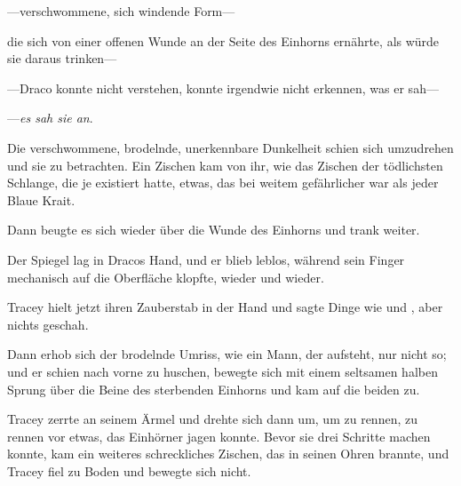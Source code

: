 —verschwommene, sich windende Form—

die sich von einer offenen Wunde an der Seite des Einhorns ernährte, als würde sie daraus trinken—

—Draco konnte nicht verstehen, konnte irgendwie nicht erkennen, was er sah—

—\emph{es sah sie an}.

Die verschwommene, brodelnde, unerkennbare Dunkelheit schien sich umzudrehen und sie zu betrachten. Ein Zischen kam von ihr, wie das Zischen der tödlichsten Schlange, die je existiert hatte, etwas, das bei weitem gefährlicher war als jeder Blaue Krait.

Dann beugte es sich wieder über die Wunde des Einhorns und trank weiter.

Der Spiegel lag in Dracos Hand, und er blieb leblos, während sein Finger mechanisch auf die Oberfläche klopfte, wieder und wieder.

Tracey hielt jetzt ihren Zauberstab in der Hand und sagte Dinge wie  und , aber nichts geschah.

Dann erhob sich der brodelnde Umriss, wie ein Mann, der aufsteht, nur nicht so; und er schien nach vorne zu huschen, bewegte sich mit einem seltsamen halben Sprung über die Beine des sterbenden Einhorns und kam auf die beiden zu.

Tracey zerrte an seinem Ärmel und drehte sich dann um, um zu rennen, zu rennen vor etwas, das Einhörner jagen konnte. Bevor sie drei Schritte machen konnte, kam ein weiteres schreckliches Zischen, das in seinen Ohren brannte, und Tracey fiel zu Boden und bewegte sich nicht.

